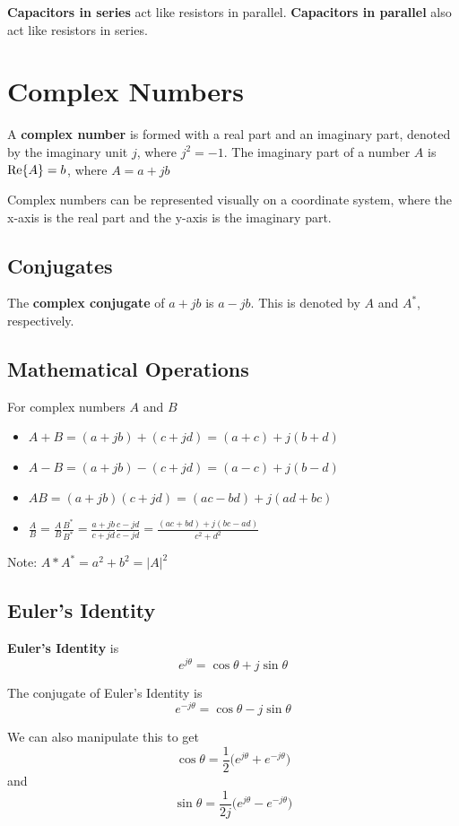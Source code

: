 \documentclass[12pt]{article}
\begin{document}
{\bf Capacitors in series} act like resistors in parallel. {\bf Capacitors in parallel} also act like resistors in series.

\section*{Complex Numbers}
A {\bf complex number} is formed with a real part and an imaginary part, denoted by the imaginary unit $j$, where $j^2 = -1$. The imaginary part of a number $A$ is ${\rm Re}\{A\} = b$, where $A = a + jb$

Complex numbers can be represented visually on a coordinate system, where the x-axis is the real part and the y-axis is the imaginary part.

\subsection*{Conjugates}
The {\bf complex conjugate} of $a + jb$ is $a - jb$. This is denoted by $A$ and $A^*$, respectively.

\subsection*{Mathematical Operations}
For complex numbers $A$ and $B$
\begin{itemize}
\item $A + B = (a + jb) + (c + jd) = (a + c) + j(b + d)$
\item $A - B = (a + jb) - (c + jd) = (a - c) + j(b - d)$
\item $AB = (a + jb)(c + jd) = (ac - bd) + j(ad + bc)$
\item $\frac{A}{B} = \frac{A}{B}\frac{B^*}{B^*} = \frac{a + jb}{c + jd}\frac{c - jd}{c - jd} = \frac{(ac + bd) + j(bc - ad)}{c^2 + d^2}$
\end{itemize}

Note: $A * A^* = a^2 + b^2 = {|A|}^2$

\subsection*{Euler's Identity}
{\bf Euler's Identity} is \[ e^{j\theta} = \cos\theta + j\sin\theta \]

The conjugate of Euler's Identity is \[ e^{-j\theta} = \cos\theta - j\sin\theta \]

We can also manipulate this to get \[ \cos\theta = \frac{1}{2}\bigl(e^{j\theta} + e^{-j\theta}\bigl) \] and \[ \sin\theta = \frac{1}{2j}\bigl(e^{j\theta} - e^{-j\theta}\bigl) \]
\end{document}
